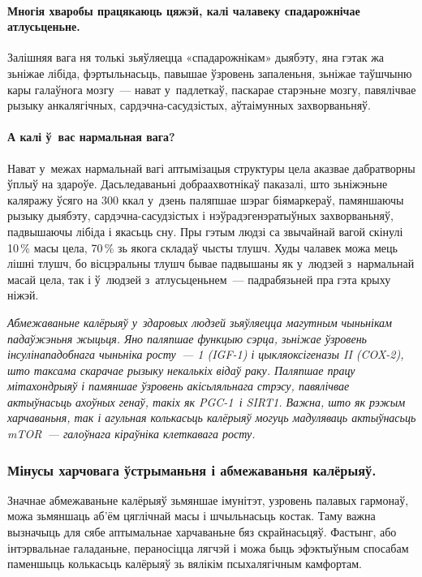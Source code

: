 \paragraph{Многія хваробы працякаюць цяжэй, калі чалавеку спадарожнічае атлусьценьне.} Залішняя вага ня толькі зьяўляецца «спадарожнікам» дыябэту, яна гэтак жа зьніжае лібіда, фэртыльнасьць, павышае ўзровень запаленьня, зьніжае таўшчыню кары галаўнога мозгу~--- нават у~падлеткаў, паскарае старэньне мозгу, павялічвае рызыку анкалягічных, сардэчна-сасудзістых, аўтаімунных захворваньняў.

\paragraph{А калі ў~вас нармальная вага?} Нават у~межах нармальнай вагі аптымізацыя структуры цела аказвае дабратворны ўплыў на здароўе. Дасьледаваньні добраахвотнікаў паказалі, што зьніжэньне каляражу ўсяго на 300 ккал у~дзень паляпшае шэраг біямаркераў, памяншаючы рызыку дыябэту, сардэчна-сасудзістых і нэўрадэгенэратыўных захворваньняў, падвышаючы лібіда і якасьць сну. Пры гэтым людзі са звычайнай вагой скінулі 10\,\% масы цела, 70\,\% зь якога складаў чысты тлушч. Худы чалавек можа мець лішні тлушч, бо вісцэральны тлушч бывае падвышаны як у~людзей з~нармальнай масай цела, так і ў~людзей з~атлусьценьнем~--- падрабязьней пра гэта крыху ніжэй.

\emph{Абмежаваньне калёрыяў у~здаровых людзей зьяўляецца магутным чыньнікам падаўжэньня жыцьця. Яно паляпшае функцыю сэрца, зьніжае ўзровень інсулінападобнага чыньніка росту~--- 1 (IGF-1) і цыкляоксігеназы II (COX-2), што таксама скарачае рызыку некалькіх відаў раку. Паляпшае працу мітахондрыяў і памяншае ўзровень акісьляльнага стрэсу, павялічвае актыўнасьць ахоўных генаў, такіх як PGC-1\alpha\ і SIRT1. Важна, што як рэжым харчаваньня, так і агульная колькасьць калёрыяў могуць мадуляваць актыўнасьць mTOR~--- галоўнага кіраўніка клеткавага росту.}

\subsubsection{Мінусы харчовага ўстрыманьня і абмежаваньня калёрыяў.}

Значнае абмежаваньне калёрыяў зьмяншае імунітэт, узровень палавых гармонаў, можа зьмяншаць аб'ём цяглічнай масы і шчыльнасьць костак. Таму важна вызначыць для сябе аптымальнае харчаваньне бяз скрайнасьцяў. Фастынг, або інтэрвальнае галаданьне, пераносіцца лягчэй і можа быць эфэктыўным спосабам паменшыць колькасьць калёрыяў зь вялікім псыхалягічным камфортам. 

